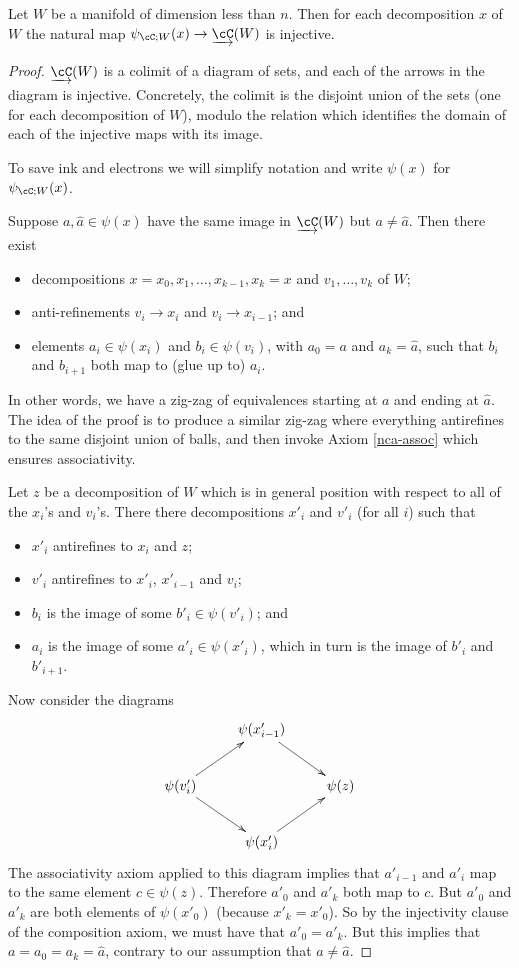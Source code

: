 \begin{lem}
\label{lem:colim-injective}
Let $W$ be a manifold of dimension less than $n$.  Then for each
decomposition $x$ of $W$ the natural map $\psi_{\cC;W}(x)\to \cl{\cC}(W)$ is injective.
\end{lem}
\begin{proof}
$\cl{\cC}(W)$ is a colimit of a diagram of sets, and each of the arrows in the diagram is
injective.
Concretely, the colimit is the disjoint union of the sets (one for each decomposition of $W$),
modulo the relation which identifies the domain of each of the injective maps
with its image.

To save ink and electrons we will simplify notation and write $\psi(x)$ for $\psi_{\cC;W}(x)$.

Suppose $a, \hat{a}\in \psi(x)$ have the same image in $\cl{\cC}(W)$ but $a\ne \hat{a}$.
Then there exist
\begin{itemize}
\item decompositions $x = x_0, x_1, \ldots , x_{k-1}, x_k = x$ and $v_1,\ldots, v_k$ of $W$;
\item anti-refinements $v_i\to x_i$ and $v_i\to x_{i-1}$; and
\item elements $a_i\in \psi(x_i)$ and $b_i\in \psi(v_i)$, with $a_0 = a$ and $a_k = \hat{a}$, 
such that $b_i$ and $b_{i+1}$ both map to (glue up to) $a_i$.
\end{itemize}
In other words, we have a zig-zag of equivalences starting at $a$ and ending at $\hat{a}$.
The idea of the proof is to produce a similar zig-zag where everything antirefines to the same
disjoint union of balls, and then invoke Axiom \ref{nca-assoc} which ensures associativity.

Let $z$ be a decomposition of $W$ which is in general position with respect to all of the 
$x_i$'s and $v_i$'s.
There there decompositions $x'_i$ and $v'_i$ (for all $i$) such that
\begin{itemize}
\item $x'_i$ antirefines to $x_i$ and $z$;
\item $v'_i$ antirefines to $x'_i$, $x'_{i-1}$ and $v_i$;
\item $b_i$ is the image of some $b'_i\in \psi(v'_i)$; and
\item $a_i$ is the image of some $a'_i\in \psi(x'_i)$, which in turn is the image
of $b'_i$ and $b'_{i+1}$.
\end{itemize}
Now consider the diagrams
\[ \xymatrix{
	& \psi(x'_{i-1}) \ar[rd] & \\
	\psi(v'_i) \ar[ru] \ar[rd] & & \psi(z) \\
	& \psi(x'_i) \ar[ru] &
} \]
The associativity axiom applied to this diagram implies that $a'_{i-1}$ and $a'_i$
map to the same element $c\in \psi(z)$.
Therefore $a'_0$ and $a'_k$ both map to $c$.
But $a'_0$ and $a'_k$ are both elements of $\psi(x'_0)$ (because $x'_k = x'_0$).
So by the injectivity clause of the composition axiom, we must have that $a'_0 = a'_k$.
But this implies that $a = a_0 = a_k = \hat{a}$, contrary to our assumption that $a\ne \hat{a}$.
\end{proof}


